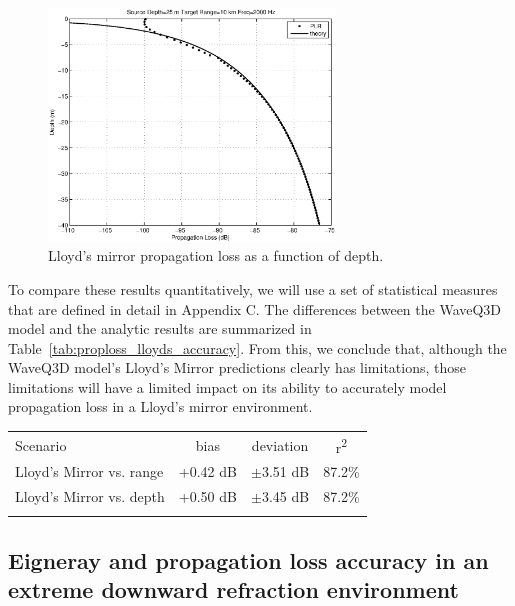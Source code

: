 \documentclass{ws-jca}
\begin{document}
\begin{figure}[th]
	\centerline{\includegraphics[width=3in]{proploss_lloyds_depth.eps}} 
	\vspace*{8pt}
	\caption{Lloyd's mirror propagation loss as a function of depth. 
	\label{fig:proploss_lloyds_depth}}
\end{figure}

To compare these results quantitatively, we will use a set of statistical
measures that are defined in detail in Appendix C. The differences between
the WaveQ3D model and the analytic results are summarized in
Table~\ref{tab:proploss_lloyds_accuracy}. From this, we conclude that,
although the WaveQ3D model's Lloyd's Mirror predictions clearly has
limitations, those limitations will have a limited impact on its ability to
accurately model propagation loss in a Lloyd's mirror environment.
\begin{table}[th]
	{\begin{tabular}{@{}lccc@{}} \toprule
		Scenario & bias & deviation & r\textsuperscript{2} \\ \colrule
		Lloyd's Mirror vs. range & +0.42 dB & \(\pm\)3.51 dB & 87.2\% \\
		Lloyd's Mirror vs. depth & +0.50 dB & \(\pm\)3.45 dB & 87.2\% \\ \botrule
	\end{tabular}}
\end{table}

\subsection{Eigneray and propagation loss accuracy in an extreme downward
refraction environment}
\end{document}
